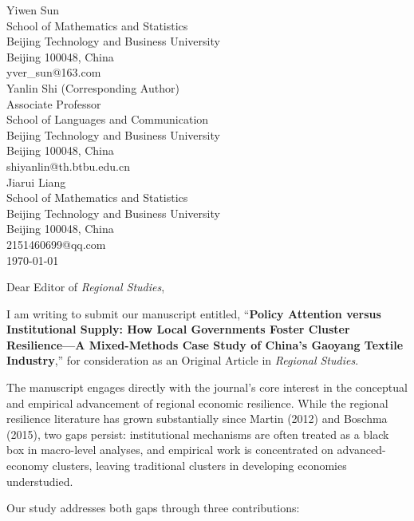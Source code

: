 \documentclass[12pt,a4paper]{article}
\begin{document}
\begin{flushright}
Yiwen Sun\\
School of Mathematics and Statistics\\
Beijing Technology and Business University\\
Beijing 100048, China\\
yver\_sun@163.com\\[1em]
Yanlin Shi (Corresponding Author)\\
Associate Professor\\
School of Languages and Communication\\
Beijing Technology and Business University\\
Beijing 100048, China\\
shiyanlin@th.btbu.edu.cn\\[1em]
Jiarui Liang\\
School of Mathematics and Statistics\\
Beijing Technology and Business University\\
Beijing 100048, China\\
2151460699@qq.com\\[1em]
\today
\end{flushright}

\vspace{1cm}

\noindent Dear Editor of \textit{Regional Studies},

\vspace{0.5cm}

I am writing to submit our manuscript entitled, ``\textbf{Policy Attention versus Institutional Supply: How Local Governments Foster Cluster Resilience---A Mixed-Methods Case Study of China's Gaoyang Textile Industry},'' for consideration as an Original Article in \textit{Regional Studies}.

The manuscript engages directly with the journal's core interest in the conceptual and empirical advancement of regional economic resilience. While the regional resilience literature has grown substantially since Martin (2012) and Boschma (2015), two gaps persist: institutional mechanisms are often treated as a black box in macro-level analyses, and empirical work is concentrated on advanced-economy clusters, leaving traditional clusters in developing economies understudied.

Our study addresses both gaps through three contributions:
\end{document}
